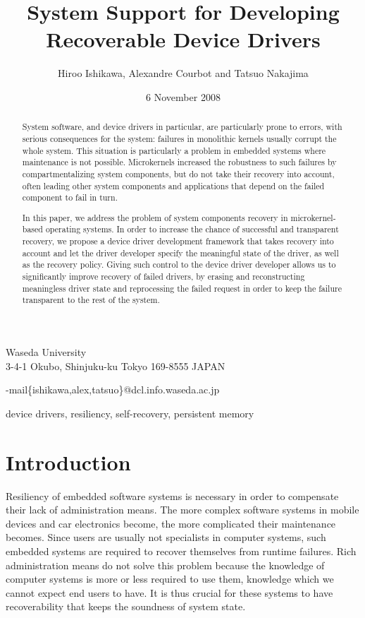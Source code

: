 \documentclass{report}
\begin{document}
\title{System Support for Developing Recoverable Device Drivers}

\author{Hiroo Ishikawa, Alexandre Courbot and Tatsuo Nakajima}
{Waseda University\\3-4-1 Okubo, Shinjuku-ku Tokyo 169-8555 JAPAN}

\E-mail{\{ishikawa,alex,tatsuo\}@dcl.info.waseda.ac.jp}
\date{6 November 2008}

\begin{abstract}
System software, and device drivers in particular, are particularly prone to errors, with serious consequences for the system: failures in monolithic kernels usually corrupt the whole system. This situation is particularly a problem in embedded systems where maintenance is not possible. Microkernels increased the robustness to such failures by compartmentalizing system components, but do not take their recovery into account, often leading other system components and applications that depend on the failed component to fail in turn.

In this paper, we address the problem of system components recovery in microkernel-based operating systems. In order to increase the chance of successful and transparent recovery, we propose a device driver development framework that takes recovery into account and let the driver developer specify the meaningful state of the driver, as well as the recovery policy. Giving such control to the device driver developer allows us to significantly improve recovery of failed drivers, by erasing and reconstructing meaningless driver state and reprocessing the failed request in order to keep the failure transparent to the rest of the system.
\end{abstract}

\begin{keywords}
device drivers, resiliency, self-recovery, persistent memory
\end{keywords}


\section{Introduction}

Resiliency of embedded software systems is necessary in order to compensate their lack of administration means.  The more complex software systems in mobile devices and car electronics become, the more complicated their maintenance becomes.  Since users are usually not specialists in computer systems, such embedded systems are required to recover themselves from runtime failures.  Rich administration means do not solve this problem because the knowledge of computer systems is more or less required to use them, knowledge which we cannot expect end users to have.  It is thus crucial for these systems to have recoverability that keeps the soundness of system state.
\end{document}
